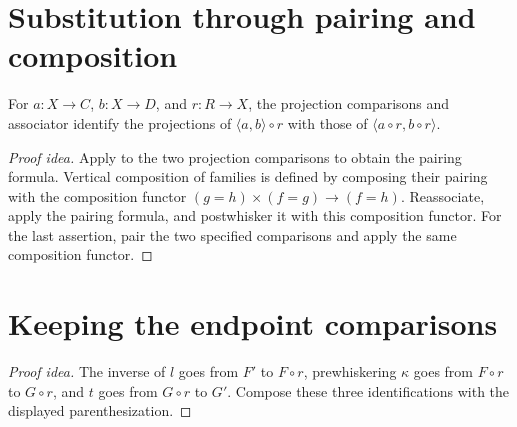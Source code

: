 \documentclass[11pt]{article}
\begin{document}
\section*{Substitution through pairing and composition}

For $a\colon X\to C$, $b\colon X\to D$, and $r\colon R\to X$, the
projection comparisons and associator identify the projections of
$\langle a,b\rangle\circ r$ with those of
$\langle a\circ r,b\circ r\rangle$.

\begin{proof}[Proof idea]
Apply  to the two projection comparisons
to obtain the pairing formula. Vertical composition of families is defined
by composing their pairing with the composition functor
$(g=h)\times(f=g)\to(f=h)$. Reassociate, apply the pairing formula, and
postwhisker it with this composition functor. For the last assertion, pair
the two specified comparisons and apply the same composition functor.
\end{proof}

\section*{Keeping the endpoint comparisons}

\begin{proof}[Proof idea]
The inverse of $l$ goes from $F'$ to $F\circ r$, prewhiskering $\kappa$
goes from $F\circ r$ to $G\circ r$, and $t$ goes from $G\circ r$ to $G'$.
Compose these three identifications with the displayed parenthesization.
\end{proof}
\end{document}
